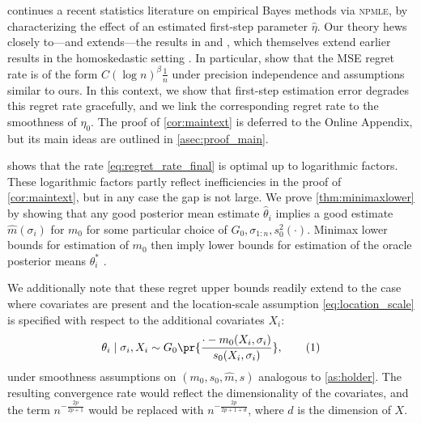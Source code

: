 \documentclass[12pt, reqno]{amsart}
\newcommand\numberthis{\addtocounter{equation}{1}\tag{\theequation}}
\newcommand{\hatm}{\hat m}
\newcommand{\hats}{\hat s}
\newcommand{\npmle}{\textsc{npmle}}
\numberwithin{equation}{section}
\begin{document}
 continues a recent statistics literature on empirical Bayes methods
via \npmle, by characterizing the effect of an estimated first-step parameter $\hat\eta$.
Our theory hews closely to---and extends---the results in \citet{jiang2020general} and
\citet{soloff2021multivariate}, which themselves extend earlier results in the
homoskedastic setting \citep{jiang2009general,saha2020nonparametric}. In particular,
\citet{soloff2021multivariate} show that the MSE regret rate is of the form $C (\log n)^
{\beta} \frac{1}{n}$ under precision independence and assumptions similar to ours. In this
context, we show that first-step estimation error degrades this regret rate gracefully,
and we link the corresponding regret rate to the smoothness of $\eta_0$. The proof of
\cref{cor:maintext} is deferred to the Online Appendix, but its main ideas are outlined in
\cref{asec:proof_main}.

 shows that the rate \eqref{eq:regret_rate_final} is optimal up to
 logarithmic factors. These logarithmic factors partly reflect inefficiencies in the proof
 of \cref{cor:maintext}, but in any case the gap is not large. We prove
 \cref{thm:minimaxlower} by showing that any good posterior mean estimate $\hat\theta_i$
 implies a good estimate $\hatm(\sigma_i)$ for $m_0$ for some particular choice of $G_0,
 \sigma_
 {1:n}, s_0^2(\cdot)$. Minimax lower bounds for estimation of $m_0$ \citep
 {tsybakov2008introduction} then imply lower bounds for estimation of the oracle
 posterior means $\theta_i^*$
\citep[see][ for a similar argument in a related setting] {ignatiadis2019covariate}.










We additionally note that these regret upper bounds readily extend to the case where
covariates are present and the location-scale assumption \eqref{eq:location_scale} is
specified with respect to the additional covariates $X_i$:
\[\theta_i \mid \sigma_i, X_i \sim G_0\pr{\frac{\cdot - m_0(X_i, \sigma_i)}{s_0(X_i,
\sigma_i)}},
\numberthis \label{eq:location-scale-covariates}
\] under smoothness assumptions on $(m_0, s_0, \hatm, \hats)$ analogous to
\cref{as:holder}. The resulting convergence rate would reflect the
 dimensionality of the covariates, and the term $n^ {- \frac{2p}{2p+1}}$ would be
 replaced with $n^ {-
\frac{2p}{2p+1+d}}$, where $d$ is the dimension of $X$. 
\end{document}
